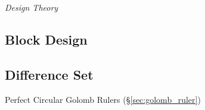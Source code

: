 \emph{Design Theory}



\subsection{Block Design}\label{sec:block_design}

\subsection{Difference Set}\label{sec:difference_set}

Perfect Circular Golomb Rulers (\S\ref{sec:golomb_ruler})
